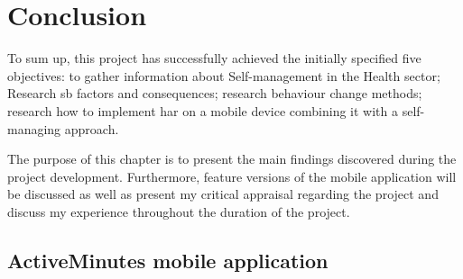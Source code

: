 \chapter{Conclusion}
To sum up, this project has successfully achieved the initially specified five objectives: to gather information about Self-management in the Health sector; Research \gls{sb} factors and consequences; research behaviour change methods; research how to implement \gls{har} on a mobile device combining it with a self-managing approach.

The purpose of this chapter is to present the main findings discovered during the project development. Furthermore, feature versions of the mobile application will be discussed as well as present my critical appraisal regarding the project and discuss my experience throughout the duration of the project. 

\section{ActiveMinutes mobile application}
